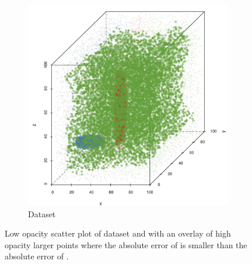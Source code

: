\begin{figure}
\begin{subfigure}{0.23\textwidth}
			\includegraphics[keepaspectratio=true, width=\textwidth, height=0.23\textheight]{discussion/img/baakman_2_abs_error_mbeSmallerThansambe}
			\caption{Dataset \baakmanTwo}
			\label{fig:discussion:multisphere:mbeLowerError:baakman2}
		\end{subfigure}	
		\caption{Low opacity scatter plot of dataset  \ferdosiTwo and  \baakmanTwo with an overlay of high opacity larger points where the absolute error of \mbe is smaller than the absolute error of \sambe.}
		\label{fig:discussion:multisphere:two:mbeLowerError}
	\end{figure}

